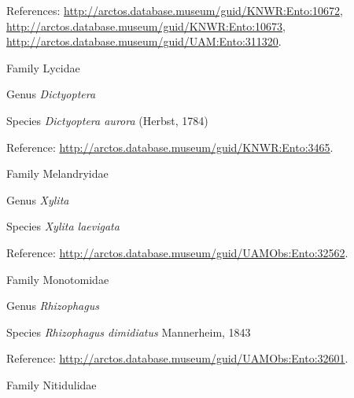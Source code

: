 \documentclass[9pt, article]{memoir}
\begin{document}
\begin{multicols}{2}
\vspace{6pt}References: 
\url{http://arctos.database.museum/guid/KNWR:Ento:10672}, 
\url{http://arctos.database.museum/guid/KNWR:Ento:10673}, 
\url{http://arctos.database.museum/guid/UAM:Ento:311320}.

\vspace{6pt}\noindent\hspace{24pt}Family Lycidae


\vspace{6pt}\noindent\hspace{30pt}Genus \textit{Dictyoptera}


\vspace{6pt}\noindent\hspace{36pt}Species \textit{Dictyoptera aurora} (Herbst, 1784)


\vspace{6pt}Reference: 
\url{http://arctos.database.museum/guid/KNWR:Ento:3465}.

\vspace{6pt}\noindent\hspace{24pt}Family Melandryidae


\vspace{6pt}\noindent\hspace{30pt}Genus \textit{Xylita}


\vspace{6pt}\noindent\hspace{36pt}Species \textit{Xylita laevigata}


\vspace{6pt}Reference: 
\url{http://arctos.database.museum/guid/UAMObs:Ento:32562}.

\vspace{6pt}\noindent\hspace{24pt}Family Monotomidae


\vspace{6pt}\noindent\hspace{30pt}Genus \textit{Rhizophagus}


\vspace{6pt}\noindent\hspace{36pt}Species \textit{Rhizophagus dimidiatus} Mannerheim, 1843


\vspace{6pt}Reference: 
\url{http://arctos.database.museum/guid/UAMObs:Ento:32601}.

\vspace{6pt}\noindent\hspace{24pt}Family Nitidulidae



\end{multicols}
\end{document}
